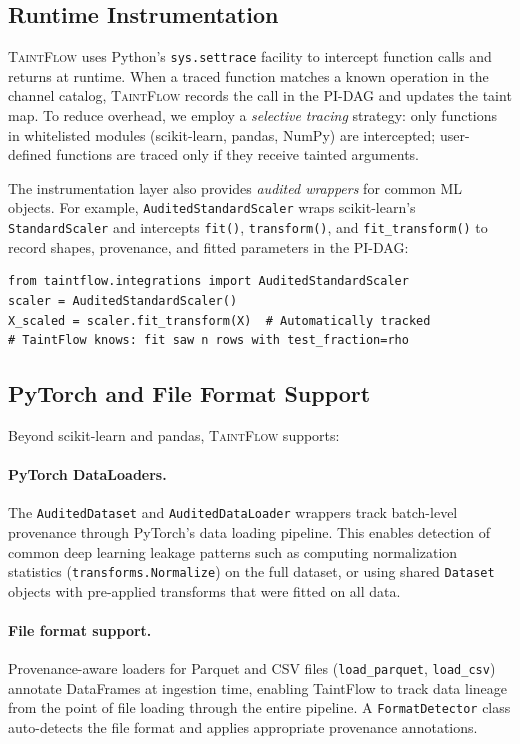 \documentclass[11pt]{article}
\begin{document}
\subsection{Runtime Instrumentation}

\textsc{TaintFlow} uses Python's \texttt{sys.settrace} facility to
intercept function calls and returns at runtime.  When a traced
function matches a known operation in the channel catalog,
\textsc{TaintFlow} records the call in the PI-DAG and updates the
taint map.  To reduce overhead, we employ a \emph{selective tracing}
strategy: only functions in whitelisted modules (scikit-learn, pandas,
NumPy) are intercepted; user-defined functions are traced only if
they receive tainted arguments.

The instrumentation layer also provides \emph{audited wrappers} for
common ML objects. For example, \texttt{AuditedStandardScaler} wraps
scikit-learn's \texttt{StandardScaler} and intercepts \texttt{fit()},
\texttt{transform()}, and \texttt{fit\_transform()} to record shapes,
provenance, and fitted parameters in the PI-DAG:

\begin{lstlisting}[caption={Audited estimator usage},label={lst:audited}]
from taintflow.integrations import AuditedStandardScaler
scaler = AuditedStandardScaler()
X_scaled = scaler.fit_transform(X)  # Automatically tracked
# TaintFlow knows: fit saw n rows with test_fraction=rho
\end{lstlisting}

\subsection{PyTorch and File Format Support}

Beyond scikit-learn and pandas, \textsc{TaintFlow} supports:

\paragraph{PyTorch DataLoaders.}  The \texttt{AuditedDataset} and
\texttt{AuditedDataLoader} wrappers track batch-level provenance
through PyTorch's data loading pipeline.  This enables detection of
common deep learning leakage patterns such as computing normalization
statistics (\texttt{transforms.Normalize}) on the full dataset, or
using shared \texttt{Dataset} objects with pre-applied transforms
that were fitted on all data.

\paragraph{File format support.}  Provenance-aware loaders for Parquet
and CSV files (\texttt{load\_parquet}, \texttt{load\_csv}) annotate
DataFrames at ingestion time, enabling TaintFlow to track data lineage
from the point of file loading through the entire pipeline.  A
\texttt{FormatDetector} class auto-detects the file format and applies
appropriate provenance annotations.
\end{document}
